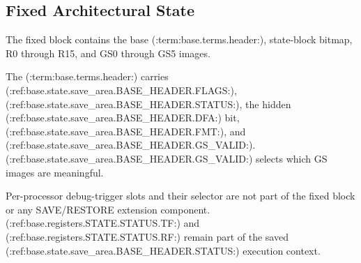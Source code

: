 \subsection{Fixed Architectural State}
The fixed block contains the base (:term:base.terms.header:), state-block bitmap, R0 through R15, and GS0 through GS5 images.

The (:term:base.terms.header:) carries (:ref:base.state.save_area.BASE_HEADER.FLAGS:), (:ref:base.state.save_area.BASE_HEADER.STATUS:), the hidden (:ref:base.state.save_area.BASE_HEADER.DFA:) bit, (:ref:base.state.save_area.BASE_HEADER.FMT:), and (:ref:base.state.save_area.BASE_HEADER.GS_VALID:). (:ref:base.state.save_area.BASE_HEADER.GS_VALID:)
selects which GS images are meaningful.

Per-processor debug-trigger slots and their selector are not part of the fixed block or any SAVE/RESTORE extension
component. (:ref:base.registers.STATE.STATUS.TF:) and (:ref:base.registers.STATE.STATUS.RF:) remain part of the saved (:ref:base.state.save_area.BASE_HEADER.STATUS:) execution context.
